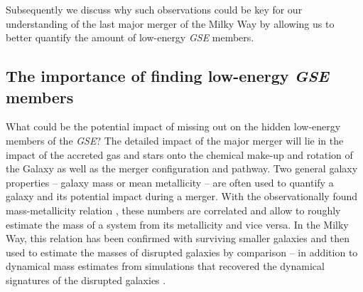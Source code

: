 \documentclass[fleqn,usenatbib]{mnras}
\begin{document}
Subsequently we discuss why such observations could be key for our understanding of the last major merger of the Milky Way by allowing us to better quantify the amount of low-energy \textit{GSE} members.

\subsection{The importance of finding low-energy \textit{GSE} members} \label{sec:discussion_strategy_finding_gse_members}

What could be the potential impact of missing out on the hidden low-energy members of the \textit{GSE}? The detailed impact of the major merger will lie in the impact of the accreted gas and stars onto the chemical make-up and rotation of the Galaxy as well as the merger configuration and pathway. Two general galaxy properties -- galaxy mass or mean metallicity -- are often used to quantify a galaxy and its potential impact during a merger. With the observationally found mass-metallicity relation \citep[for example][]{Gallazzi2005, Kirby2013}, these numbers are correlated and allow to roughly estimate the mass of a system from its metallicity and vice versa. In the Milky Way, this relation has been confirmed with surviving smaller galaxies \citep{Kirby2013} and then used to estimate the masses of disrupted galaxies by comparison \citep[for example][]{Helmi2018} -- in addition to dynamical mass estimates from simulations that recovered the dynamical signatures of the disrupted galaxies \citep[for example][]{Naidu2022b}.
\end{document}
